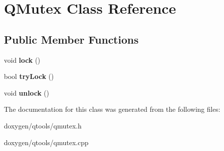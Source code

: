 \hypertarget{class_q_mutex}{}\section{Q\+Mutex Class Reference}
\label{class_q_mutex}
\subsection*{Public Member Functions}
\begin{DoxyCompactItemize}
\item 
\mbox{\label{class_q_mutex_ab503e77f0c222bc4b90084a9937391e9}} 
void {\bfseries lock} ()
\item 
\mbox{\label{class_q_mutex_a7701559dee8bba8b8da220094e0d32be}} 
bool {\bfseries try\+Lock} ()
\item 
\mbox{\label{class_q_mutex_a3d8f31a43c7e73ff4d95dd61fa9df82c}} 
void {\bfseries unlock} ()
\end{DoxyCompactItemize}


The documentation for this class was generated from the following files\+:\begin{DoxyCompactItemize}
\item 
doxygen/qtools/qmutex.\+h\item 
doxygen/qtools/qmutex.\+cpp\end{DoxyCompactItemize}
